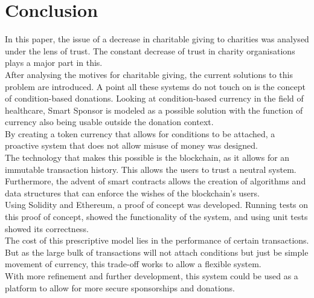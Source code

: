 \chapter{Conclusion}
In this paper, the issue of a decrease in charitable giving to charities was analysed under the lens of trust. The constant decrease of trust in charity organisations plays a major part in this.\\
After analysing the motives for charitable giving, the current solutions to this problem are introduced. A point all these systems do not touch on is the concept of condition-based donations. Looking at condition-based currency in the field of healthcare, Smart Sponsor is modeled as a possible solution with the function of currency also being usable outside the donation context.\\
By creating a token currency that allows for conditions to be attached, a proactive system that does not allow misuse of money was designed.\\
The technology that makes this possible is the blockchain, as it allows for an immutable transaction history. This allows the users to trust a neutral system. Furthermore, the advent of smart contracts allows the creation of algorithms and data structures that can enforce the wishes of the blockchain's users.\\
Using Solidity and Ethereum, a proof of concept was developed. Running tests on this proof of concept, showed the functionality of the system, and using unit tests showed its correctness.\\
The cost of this prescriptive model lies in the performance of certain transactions. But as the large bulk of transactions will not attach conditions but just be simple movement of currency, this trade-off works to allow a flexible system.\\
With more refinement and further development, this system could be used as a platform to allow for more secure sponsorships and donations.